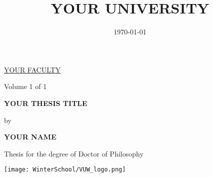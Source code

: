 \documentclass[a4paper,11pt]{article}
\begin{document}
\begin{titlepage}
\begin{center}
\title{YOUR UNIVERSITY}
\large\underline{YOUR FACULTY} 
\par \vspace{0.4in} %
\normalsize{Volume 1 of 1}
\par \vspace{0.4in}
\large{\textbf{YOUR THESIS TITLE}}
\par \vspace{0.2in}
{by}
\par \vspace{0.2in}
\large{\textbf{YOUR NAME}}
\par \vspace{0.4in}
\large{Thesis for the degree of Doctor of Philosophy}
\par \vspace{0.5in}
\date{\today}

\texttt{[image: WinterSchool/VUW\_logo.png]} %

\end{center}
\end{titlepage}

\newpage\null\thispagestyle{empty}\newpage %
\pagestyle{plain}

\setcounter{secnumdepth}{3} %
\setcounter{tocdepth}{3}  

\tableofcontents 
\cleardoublepage
{} %

 



%
\end{document}
